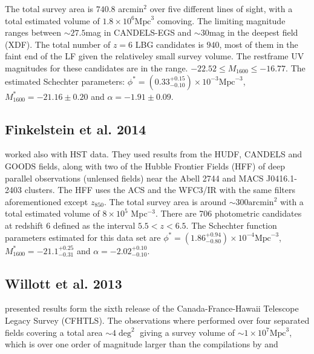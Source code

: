 \documentclass{emulateapj}
\begin{document}
The total survey area is $740.8$ arcmin$^2$ over five different lines
of sight, with a total estimated volume of  $1.8 \times 10^6
\textrm{Mpc}^3$ comoving. 
The limiting magnitude ranges between $\sim27.5$mag in CANDELS-EGS and
$\sim30 $mag in  the  deepest field (XDF). 
The total number of $z=6$ LBG candidates is $940$, most of 
them in the faint end of the LF given the relativeley small survey volume.
The restframe UV magnitudes for these candidates are in the range.
$-22.52\leq M_{1600} \leq -16.77$.
The estimated Schechter parameters:
$\phi^* =(0.33_{-0.10}^{+0.15}) \times 10 ^{-3}  \textrm{Mpc}^{-3} $, 
$M^*_{1600} = -21.16\pm 0.20$ and $\alpha = -1.91 \pm 0.09$. 


\subsection{Finkelstein et al. 2014}
\citet{Finkelstein14} worked also with HST data.
They used results from the HUDF, CANDELS and GOODS  fields, along with
two of the Hubble Frontier Fields (HFF) of deep parallel  observations
(unlensed fields) near the Abell 2744 and MACS J0416.1-2403  clusters. 
The HFF uses the ACS and the WFC3/IR with the same filters
aforementioned except $z_{850}$. 
The total survey area is around   $\sim300\textrm{arcmin}^2$ with a
total estimated volume of $8\times 10^5$ Mpc$^{-3}$.
There are 706 photometric candidates at redshift 6  defined as the
interval $5.5<z<6.5$. 
The Schechter function parameters estimated for this data set 
are $\phi^* =(1.86_{-0.80}^{+0.94}) \times 10 ^{-4}  \textrm{Mpc}^{-3} $, 
$M^*_{1600} = -21.1_{-0.31}^{+0.25}$ and $\alpha = -2.02_{-0.10}^{+0.10}$. 
 
\subsection{Willott et al. 2013}
\citet{Willott13} presented results form the sixth release of the Canada-France-Hawaii 
Telescope Legacy Survey (CFHTLS). 
The observations where performed over four separated fields covering a
total area $\sim 4 \deg^2$ giving a survey volume of $\sim 1 \times
10^7 \textrm{Mpc}^3$, which is over one order of magnitude larger than
the compilations by \citet{Bouwens15} and \citet{Finkelstein14} 
\end{document}
